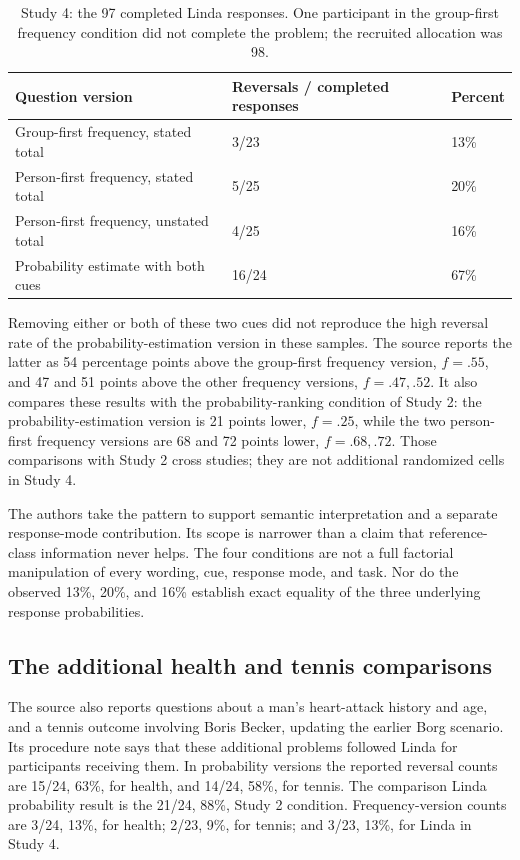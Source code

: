 \begin{table}[htbp]
\centering
\begin{tabular}{p{}p{}p{}}
\hline
Question version & Reversals / completed responses & Percent\\ \hline
Group-first frequency, stated total &3/23&13\%\\
Person-first frequency, stated total &5/25&20\%\\
Person-first frequency, unstated total &4/25&16\%\\
Probability estimate with both cues &16/24&67\%\\ \hline
\end{tabular}
\caption{Study 4: the 97 completed Linda responses.
One participant in the group-first frequency condition did not
complete the problem; the recruited allocation was 98.}
\label{tab:p19-conjunction-language-cues}
\end{table}

Removing either or both of these two cues did not reproduce the
high reversal rate of the probability-estimation version in these
samples. The source reports the latter as 54 percentage points
above the group-first frequency version, \(f=.55\), and 47 and
51 points above the other frequency versions, \(f=.47,.52\).
It also compares these results with the probability-ranking
condition of Study 2: the probability-estimation version is 21
points lower, \(f=.25\), while the two person-first frequency
versions are 68 and 72 points lower, \(f=.68,.72\).
Those comparisons with Study 2 cross studies; they are not
additional randomized cells in Study 4.

The authors take the pattern to support semantic interpretation
and a separate response-mode contribution. Its scope is narrower
than a claim that reference-class information never helps.
The four conditions are not a full factorial manipulation of every
wording, cue, response mode, and task. Nor do the observed 13\%,
20\%, and 16\% establish exact equality of the three underlying
response probabilities.

\subsection{The additional health and tennis comparisons}

The source also reports questions about a man's heart-attack history
and age, and a tennis outcome involving Boris Becker, updating
the earlier Borg scenario. Its procedure note says that these
additional problems followed Linda for participants receiving them.
In probability versions the reported reversal counts are 15/24,
63\%, for health, and 14/24, 58\%, for tennis.
The comparison Linda probability result is the 21/24, 88\%,
Study 2 condition.
Frequency-version counts are 3/24, 13\%, for health; 2/23, 9\%,
for tennis; and 3/23, 13\%, for Linda in Study 4.

